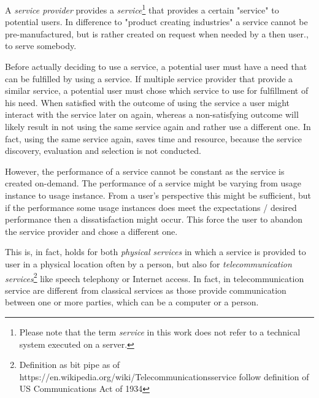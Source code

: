 A \emph{service provider} provides a \emph{service}\footnote{Please note that the term \emph{service} in this work does not refer to a technical system executed on a server.} that provides a certain "service" to potential users.
In difference to "product creating industries" a service cannot be pre-manufactured, but is rather created on request when needed by a then user., \ie to serve somebody.

Before actually deciding to use a service, a potential user must have a need that can be fulfilled by using a service. %
If multiple service provider that provide a similar service, a potential user must chose which service to use for fulfillment of his need.
When satisfied with the outcome of using the service a user might interact with the service later on again, whereas a non-satisfying outcome will likely result in not using the same service again and rather use a different one.
In fact, using the same service again, saves time and resource, because the service discovery, evaluation and selection is not conducted.

However, the performance of a service cannot be constant as the service is created on-demand.
The performance of a service might be varying from usage instance to usage instance.
From a user's perspective this might be sufficient, but if the performance some usage instances does meet the expectations / desired performance then a dissatisfaction might occur.
This force the user to abandon the service provider and chose a different one.

This is, in fact, holds for both \emph{physical services} in which a service is provided to user in a physical location often by a person, but also for \emph{telecommunication services}\footnote{Definition as bit pipe as of https://en.wikipedia.org/wiki/Telecommunicationsservice follow definition of US Communications Act of 1934} like speech telephony or Internet access.
In fact, in telecommunication service are different from classical services as those provide communication between one or more parties, which can be a computer or a person.

